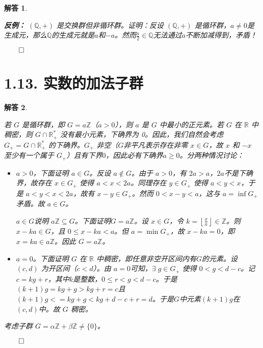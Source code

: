 \documentclass[12pt,UTF8]{ctexbook}
\theoremstyle{exercisestyle}
\theoremstyle{solutionstyle}
\newtheorem*{solution*}{解答}
\newenvironment{solution}
  {\begin{solution*}}
  {\hfill\ensuremath{\qed}\end{solution*}}
\begin{document}
\begin{solution}
\begin{subquestions}
        \textbf{反例：} $(\mathbb{Q},+)$ 是交换群但非循环群。证明：反设 $(\mathbb{Q},+)$ 是循环群，$a\neq 0$是生成元，那么$\mathbb{Q}$的生成元就是$a$和$-a$。然而$\displaystyle\frac{a}{2}\in \mathbb{Q}$无法通过$a$不断加减得到，矛盾！
    \end{subquestions}
\end{solution}

\section{1.13. 实数的加法子群}
\begin{solution}
  \begin{subquestions}
  \item 若 \(G\) 是循环群，即 \(G = a\mathbb{Z}\)（\(a > 0\)），则 \(a\) 是 \(G\) 中最小的正元素。若 \(G\) 在 \(\mathbb{R}\) 中稠密，则 \(G \cap \mathbb{R}_+^*\) 没有最小元素，下确界为 0。因此，我们自然会考虑 \(G_+ = G \cap \mathbb{R}_+^*\) 的下确界。\(G_+\) 非空（$G$非平凡表示存在非零 \(x \in G\)，故 \(x\) 和 \(-x\) 至少有一个属于 \(G_+\)）且有下界$0$，因此必有下确界$a \geqslant 0$。分两种情况讨论：
  
  \begin{itemize}
    \item \(a > 0\)，下面证明 \(a \in G\)。反设 \(a \notin G\)。由于 \(a > 0\)，有 \(2a > a\)，$2a$不是下确界，故存在 \(x \in G_+\) 使得 \(a < x < 2a\)。同理存在 \(y \in G_+\) 使得 \(a < y < x\)，于是 \(a < y < x < 2a\)，故有 \(x - y \in G_+\)。然而 \(0 < x - y < a\)，这与 \(a = \inf G_+\) 矛盾。故 \(a \in G\)。
    
    \(a \in G\)说明 \(a\mathbb{Z} \subseteq G\)。下面证明\(G = a\mathbb{Z}\)。设 \(x \in G\)，令 \(k = \left\lfloor \frac{x}{a} \right\rfloor \in \mathbb{Z}\)。则 \(x - ka \in G\)，且 \(0 \leqslant x - ka < a\)。但 \(a = \min G_+\)，故 \(x - ka = 0\)，即 \(x = ka \in a\mathbb{Z}\)。因此 \(G = a\mathbb{Z}\)。
    
    \item \(a = 0\)。下面证明 \(G\) 在 \(\mathbb{R}\) 中稠密，即任意非空开区间内有$G$的元素。设 \((c, d)\) 为开区间（\(c < d\)）。由 \(a = 0\)可知，\(\exists \; g \in G_+\) 使得 \(0 < g < d - c\)。记$c = kg + r$，其中$k$是整数，$0\leqslant r < g < d - c$。于是$(k + 1)g = kg + g > kg + r = c$且$(k + 1)g < = kg + g < kg + d - c + r = d$。于是$G$中元素$(k + 1)g$在$(c, d)$中。故 \(G\) 稠密。
  \end{itemize}
    \item 考虑子群 \(G = \alpha \mathbb{Z} + \beta \mathbb{Z} \neq \{0\}\)。
    

\end{subquestions}
\end{solution}
\end{document}
